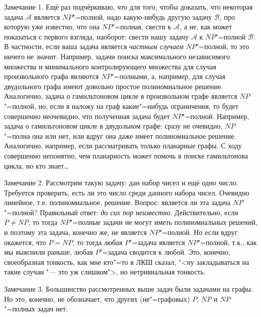 \documentclass[a4paper,10pt]{problems}
\newcommand{\A}{{\ensuremath{\mathcal{A}}}}
\newcommand{\B}{{\ensuremath{\mathcal{B}}}}
\begin{document}
Замечание 1. Ещё раз подчёркиваю, что для того, чтобы доказать, что некоторая 
задача \A{} является $NP$"=полной, надо какую-нибудь другую задачу \B, про 
которую уже известно, что она $NP$"=полная, свести к \A, а не, как может 
показаться с первого взгляда, наоборот: свести нашу задачу \A{} к $NP$"=полной 
\B. В частности, если ваша задача является \textit{частным случаем} 
$NP$"=полной, то это ничего не значит. Например, задачи поиска максимального 
независимого множества и минимального контролирующего множества для случая 
произвольного графа являются $NP$"=полными, а, например, для случая двудольного 
графа имеют довольно простое полиномиальное решение. Аналогично, задача о 
гамильтоновом цикле в произвольном графе является $NP$"=полной, но, если я 
наложу на граф какие"=нибудь ограничения, то будет совершенно неочевидно, что 
полученная задача будет $NP$"=полной. Например, задача о гамильтоновом цикле в 
двудольном графе: сразу не очевидно, $NP$"=полна она или нет, или вдруг она 
даже имеет полиномиальное решение. Аналогично, например, если рассматривать только 
планарные графы. С ходу совершенно непонятно, чем планарность может помочь в 
поиске гамильтонова цикла, но кто знает\dots

Замечание 2. Рассмотрим такую задачу: дан набор чисел и ещё одно число. 
Требуется проверить, есть ли это число среди данного набора чисел. Очевидно 
линейное, т.е. полиномиальное, решение. Вопрос: является ли эта задача 
$NP$"=полной? Правильный ответ: \textit{до сих пор неизвестно}. Действительно, 
если $P\neq NP$, то тогда $NP$"=полные задачи не могут иметь полиномиальных 
решений, и поэтому эта задача, конечно же, не является $NP$"=полной. Но если 
вдруг окажется, что $P=NP$, то тогда \textit{любая} $P$"=задача является 
$NP$"=полной, т.к., как мы выяснили раньше, любая $P$"=задача сводится к любой. 
Это, конечно, своеобразная тонкость, как мне кто"=то в ЛКШ сказал, "<ну 
закладываться на такие случаи "--- это уж слишком">, но нетривиальная тонкость.

Замечание 3. Большинство рассмотренных выше задач были задачами на графы. Но 
это, конечно, не обозначает, что других (не"=графовых) $P$, $NP$ и $NP$"=полных задач нет.
\end{document}
